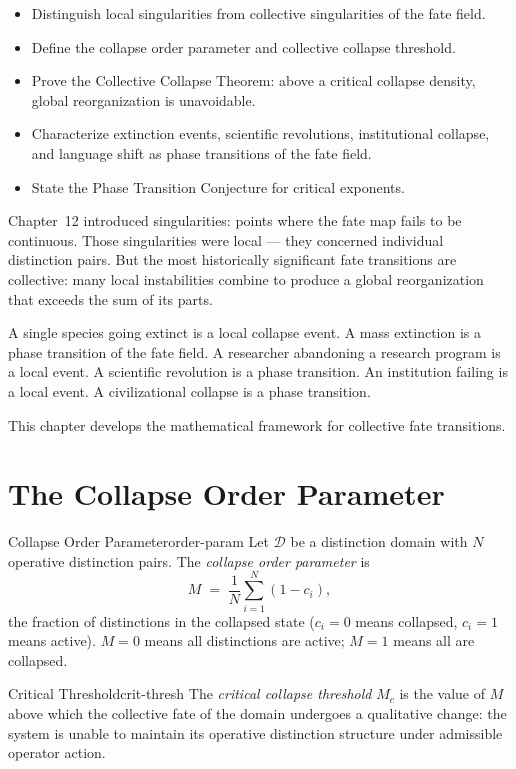 \documentclass[12pt,twoside,openright]{book}
\newenvironment{objectives}{%
  \begin{tcolorbox}[colback=DistBlue!5,colframe=DistBlue,
    title={\faCheckCircle\enspace Chapter Objectives},
    fonttitle=\sffamily\bfseries\color{white},
    attach boxed title to top left={yshift=-2mm,xshift=4mm},
    boxed title style={colback=DistBlue},breakable]
  \begin{itemize}[leftmargin=*,nosep]}{%
  \end{itemize}\end{tcolorbox}\vspace{1em}}
\providecommand{\orderParam}{M}
\providecommand{\critThresh}{M_{c}}
\providecommand{\localCollapse}[1]{c_{#1}}
\begin{document}
\begin{objectives}
\item Distinguish local singularities from collective
  singularities of the fate field.
\item Define the collapse order parameter and collective
  collapse threshold.
\item Prove the Collective Collapse Theorem: above a critical
  collapse density, global reorganization is unavoidable.
\item Characterize extinction events, scientific revolutions,
  institutional collapse, and language shift as phase
  transitions of the fate field.
\item State the Phase Transition Conjecture for critical exponents.
\end{objectives}

Chapter~12 introduced singularities: points where the fate map
fails to be continuous. Those singularities were local --- they
concerned individual distinction pairs. But the most historically
significant fate transitions are collective: many local
instabilities combine to produce a global reorganization that
exceeds the sum of its parts.

A single species going extinct is a local collapse event.
A mass extinction is a phase transition of the fate field.
A researcher abandoning a research program is a local event.
A scientific revolution is a phase transition.
An institution failing is a local event.
A civilizational collapse is a phase transition.

This chapter develops the mathematical framework for collective
fate transitions.

\section{The Collapse Order Parameter}

\begin{definition}{Collapse Order Parameter}{order-param}
Let $\mathcal{D}$ be a distinction domain with $N$ operative
distinction pairs. The \emph{collapse order parameter} is
\[
  \orderParam
  \;=\;
  \frac{1}{N}\sum_{i=1}^{N}(1-\localCollapse{i}),
\]
the fraction of distinctions in the collapsed state
($\localCollapse{i}=0$ means collapsed, $\localCollapse{i}=1$
means active). $\orderParam=0$ means all distinctions are
active; $\orderParam=1$ means all are collapsed.
\end{definition}

\begin{definition}{Critical Threshold}{crit-thresh}
The \emph{critical collapse threshold} $\critThresh$ is the
value of $\orderParam$ above which the collective fate of the
domain undergoes a qualitative change: the system is unable to
maintain its operative distinction structure under admissible
operator action.
\end{definition}
\end{document}
